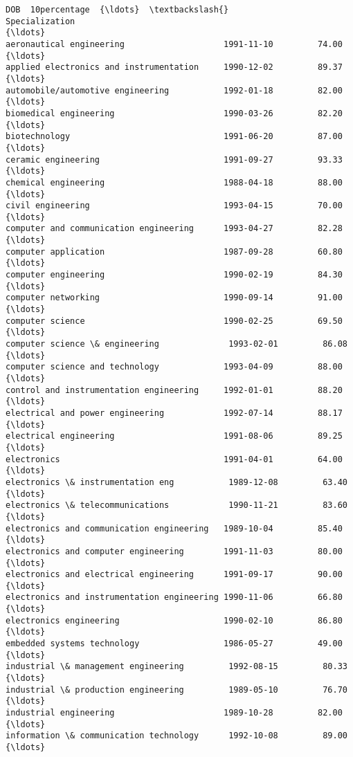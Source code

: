 \documentclass[11pt]{article}
\begin{document}
\begin{tcolorbox}[breakable, size=fbox, boxrule=.5pt, pad at break*=1mm, opacityfill=0]
\begin{Verbatim}[commandchars=\\\{\}]
                                                   DOB  10percentage  {\ldots}  \textbackslash{}
Specialization                                                        {\ldots}
aeronautical engineering                    1991-11-10         74.00  {\ldots}
applied electronics and instrumentation     1990-12-02         89.37  {\ldots}
automobile/automotive engineering           1992-01-18         82.00  {\ldots}
biomedical engineering                      1990-03-26         82.20  {\ldots}
biotechnology                               1991-06-20         87.00  {\ldots}
ceramic engineering                         1991-09-27         93.33  {\ldots}
chemical engineering                        1988-04-18         88.00  {\ldots}
civil engineering                           1993-04-15         70.00  {\ldots}
computer and communication engineering      1993-04-27         82.28  {\ldots}
computer application                        1987-09-28         60.80  {\ldots}
computer engineering                        1990-02-19         84.30  {\ldots}
computer networking                         1990-09-14         91.00  {\ldots}
computer science                            1990-02-25         69.50  {\ldots}
computer science \& engineering              1993-02-01         86.08  {\ldots}
computer science and technology             1993-04-09         88.00  {\ldots}
control and instrumentation engineering     1992-01-01         88.20  {\ldots}
electrical and power engineering            1992-07-14         88.17  {\ldots}
electrical engineering                      1991-08-06         89.25  {\ldots}
electronics                                 1991-04-01         64.00  {\ldots}
electronics \& instrumentation eng           1989-12-08         63.40  {\ldots}
electronics \& telecommunications            1990-11-21         83.60  {\ldots}
electronics and communication engineering   1989-10-04         85.40  {\ldots}
electronics and computer engineering        1991-11-03         80.00  {\ldots}
electronics and electrical engineering      1991-09-17         90.00  {\ldots}
electronics and instrumentation engineering 1990-11-06         66.80  {\ldots}
electronics engineering                     1990-02-10         86.80  {\ldots}
embedded systems technology                 1986-05-27         49.00  {\ldots}
industrial \& management engineering         1992-08-15         80.33  {\ldots}
industrial \& production engineering         1989-05-10         76.70  {\ldots}
industrial engineering                      1989-10-28         82.00  {\ldots}
information \& communication technology      1992-10-08         89.00  {\ldots}

\end{Verbatim}
\end{tcolorbox}
\end{document}
